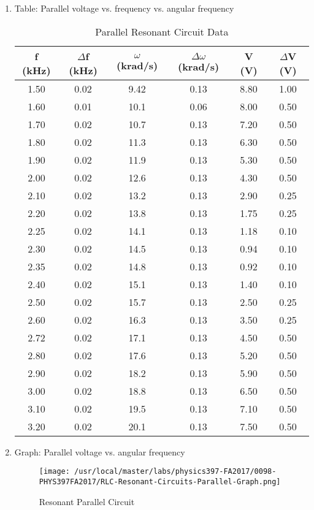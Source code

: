 \begin{enumerate}[resume]
\newpage
\item Table: Parallel voltage vs. frequency vs. angular frequency
\begin{table}[h]
\center
\begin{tabular}{|c|c|c|c|c|c|}
\hline
f (kHz) & $\Delta$f (kHz) & $\omega$ (krad/s) & $\Delta\omega$ (krad/s) & V (V) & $\Delta$V (V)\\
\hline
1.50&0.02&9.42&0.13&8.80&1.00\\
1.60&0.01&10.1&0.06&8.00&0.50\\
1.70&0.02&10.7&0.13&7.20&0.50\\
1.80&0.02&11.3&0.13&6.30&0.50\\
1.90&0.02&11.9&0.13&5.30&0.50\\
2.00&0.02&12.6&0.13&4.30&0.50\\
2.10&0.02&13.2&0.13&2.90&0.25\\
2.20&0.02&13.8&0.13&1.75&0.25\\
2.25&0.02&14.1&0.13&1.18&0.10\\
2.30&0.02&14.5&0.13&0.94&0.10\\
2.35&0.02&14.8&0.13&0.92&0.10\\
2.40&0.02&15.1&0.13&1.40&0.10\\
2.50&0.02&15.7&0.13&2.50&0.25\\
2.60&0.02&16.3&0.13&3.50&0.25\\
2.72&0.02&17.1&0.13&4.50&0.50\\
2.80&0.02&17.6&0.13&5.20&0.50\\
2.90&0.02&18.2&0.13&5.90&0.50\\
3.00&0.02&18.8&0.13&6.50&0.50\\
3.10&0.02&19.5&0.13&7.10&0.50\\
3.20&0.02&20.1&0.13&7.50&0.50\\
\hline
\end{tabular}
\label{tbl:RLCParallel}
\caption{Parallel Resonant Circuit Data}
\end{table}
\item Graph: Parallel voltage vs. angular frequency
  \begin{figure}[h!]
    \texttt{[image: /usr/local/master/labs/physics397-FA2017/0098-PHYS397FA2017/RLC-Resonant-Circuits-Parallel-Graph.png]}
    \caption{Resonant Parallel Circuit}
    \label{pic:RLCParallel}
  \end{figure}
\end{enumerate}


